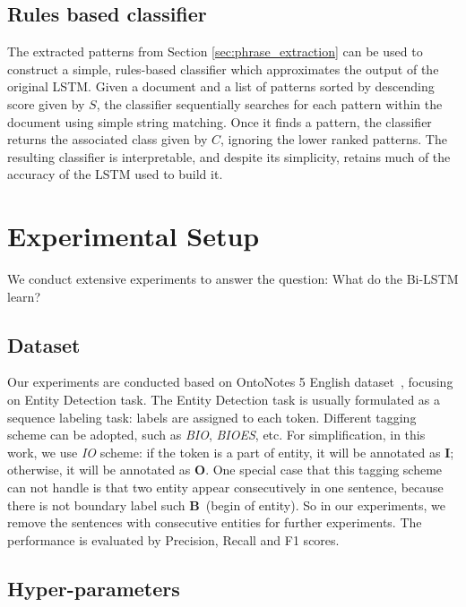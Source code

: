 \documentclass{article}
\begin{document}
\subsection{Rules based classifier}
The extracted patterns from Section \ref{sec:phrase_extraction} can be used to construct a simple, rules-based classifier which approximates the output of the original LSTM. Given a document and a list of patterns sorted by descending score given by $S$, the classifier sequentially searches for each pattern within the document using simple string matching. Once it finds a pattern, the classifier returns the associated class given by $C$, ignoring the lower ranked patterns. The resulting classifier is interpretable,  and despite its simplicity,  retains much of the accuracy of the LSTM used to build it.



\section{Experimental Setup}

We conduct extensive experiments to answer the question: What do the Bi-LSTM learn? 


\subsection{Dataset} Our experiments are conducted based on OntoNotes 5 English dataset~\cite{weischedel2012ontonotes}, focusing on Entity Detection task. The Entity Detection task is usually formulated as a sequence labeling task: labels are assigned to each token. Different tagging scheme can be adopted, such as \textit{BIO}, \textit{BIOES}, etc. For simplification, in this work, we use \textit{IO} scheme: if the token is a part of entity, it will be annotated as \textbf{I}; otherwise, it will be annotated as \textbf{O}. One special case that this tagging scheme can not handle is that two entity appear consecutively in one sentence, because there is not boundary label such \textbf{B}~(begin of entity). So in our experiments, we remove the sentences with consecutive entities for further experiments. The performance is evaluated by Precision, Recall and F1 scores.

\subsection{Hyper-parameters}
\end{document}
